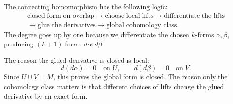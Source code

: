 \documentclass[11pt]{article}
\begin{document}
The connecting homomorphism has the following logic:
\[
\begin{gathered}
 \text{closed form on overlap}
 \to
 \text{choose local lifts}
 \to
 \text{differentiate the lifts}\\
 \to
 \text{glue the derivatives}
 \to
 \text{global cohomology class}.
\end{gathered}
\]
The degree goes up by one because we differentiate the chosen $k$-forms $\alpha,\beta$, producing $(k+1)$-forms $d\alpha,d\beta$.

The reason the glued derivative is closed is local:
\[
 d(d\alpha)=0\quad\text{on }U,
\qquad
 d(d\beta)=0\quad\text{on }V.
\]
Since $U\cup V=M$, this proves the global form is closed. The reason only the cohomology class matters is that different choices of lifts change the glued derivative by an exact form.
\end{document}
